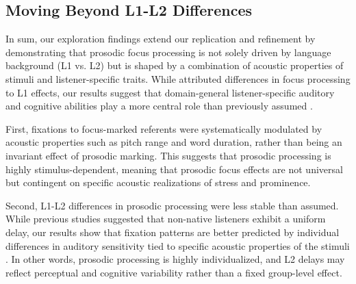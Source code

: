 \subsection{Moving Beyond L1-L2 Differences}

In sum, our exploration findings extend our replication and refinement by demonstrating that prosodic focus processing is not solely driven by language background (L1 vs. L2) but is shaped by a combination of acoustic properties of stimuli and listener-specific traits. While \cite{Ge2021} attributed differences in focus processing to L1 effects, our results suggest that domain-general listener-specific auditory and cognitive abilities play a more central role than previously assumed \citep{saito2022does, bramlett_wiener_24_speechprosody, bakkouche2025effects, Kachlicka_Saito_Tierney_2019}.

First, fixations to focus-marked referents were systematically modulated by acoustic properties such as pitch range and word duration, rather than being an invariant effect of prosodic marking. This suggests that prosodic processing is highly stimulus-dependent, meaning that prosodic focus effects are not universal but contingent on specific acoustic realizations of stress and prominence.

Second, L1-L2 differences in prosodic processing were less stable than assumed. While previous studies suggested that non-native listeners exhibit a uniform delay, our results show that fixation patterns are better predicted by individual differences in auditory sensitivity tied to specific acoustic properties of the stimuli \citep{xie2023adaptive}. In other words, prosodic processing is highly individualized, and L2 delays may reflect perceptual and cognitive variability rather than a fixed group-level effect. 

